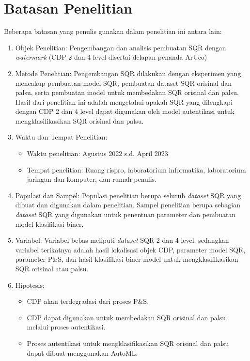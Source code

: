 \section{Batasan Penelitian}
Beberapa batasan yang penulis gunakan dalam penelitian ini antara lain:
\begin{enumerate}
    \item Objek Penelitian: Pengembangan dan analisis pembuatan SQR dengan \emph{watermark} (CDP 2 dan 4 level disertai delapan penanda ArUco)
    \item Metode Penelitian: Pengembangan SQR dilakukan dengan eksperimen yang mencakup pembuatan model SQR, pembuatan dataset SQR orisinal dan palsu, serta pembuatan
          model untuk membedakan SQR orisinal dan palsu. Hasil dari penelitian ini adalah mengetahui apakah SQR yang dilengkapi dengan CDP 2 dan 4 level dapat digunakan
          oleh model autentikasi untuk mengklasifikasikan SQR orisinal dan palsu.
    \item Waktu dan Tempat Penelitian:
          \begin{itemize}
              \item Waktu penelitian: Agustus 2022 s.d. April 2023
              \item Tempat penelitian: Ruang rispro, laboratorium informatika, laboratorium jaringan dan komputer, dan rumah penulis.
          \end{itemize}
    \item Populasi dan Sampel: Populasi penelitian berupa seluruh \emph{dataset} SQR yang dibuat dan digunakan dalam penelitian. Sampel penelitian berupa sebagian
          \emph{dataset} SQR yang digunakan untuk penentuan parameter dan pembuatan model klasifikasi biner.
    \item Variabel: Variabel bebas meliputi \emph{dataset} SQR 2 dan 4 level, sedangkan variabel terikatnya adalah hasil lokalisasi objek CDP, parameter model SQR,
          parameter P\&S, dan hasil klasifikasi biner model untuk mengklasifikasikan SQR orisinal atau palsu.
    \item Hipotesis:
          \begin{itemize}
              \item CDP akan terdegradasi dari proses P\&S.
              \item CDP dapat digunakan untuk membedakan SQR orisinal dan palsu melalui proses autentikasi.
              \item Proses autentikasi untuk mengklasifikasikan SQR orisinal dan palsu dapat dibuat menggunakan AutoML.

\end{itemize}
\end{enumerate}
